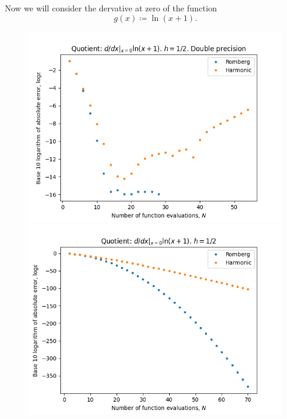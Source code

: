 Now we will consider the dervative at zero of the function 
\[
g(x) \coloneqq \ln(x+1).
\]

\begin{figure}[H]
\centering
\begin{minipage}{0.45\textwidth}
\centering
\includegraphics[scale=0.45]{../results/diff_quot_plots/h_one.png}
\end{minipage}
\begin{minipage}{0.45\textwidth}
\centering
\includegraphics[scale=0.45]{../results/diff_quot_plots/h_one_hp.png}
\end{minipage}
\end{figure}

